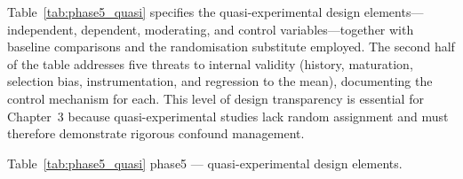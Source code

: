\vspace{1.5em}

Table~\ref{tab:phase5_quasi} specifies the quasi-experimental design elements---independent, dependent, moderating, and control variables---together with baseline comparisons and the randomisation substitute employed. The second half of the table addresses five threats to internal validity (history, maturation, selection bias, instrumentation, and regression to the mean), documenting the control mechanism for each. This level of design transparency is essential for Chapter~3 because quasi-experimental studies lack random assignment and must therefore demonstrate rigorous confound management.

\begingroup\singlespacing\tablefontsize\tablestripes
\noindent Table~\ref{tab:phase5_quasi} phase5 --- quasi-experimental design elements.

